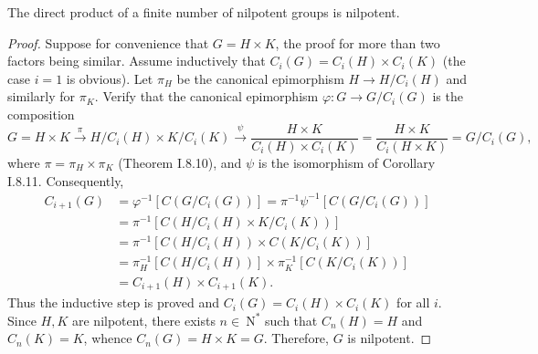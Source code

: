 \begin{theorem}
    The direct product of a finite number of nilpotent groups is nilpotent.
    \begin{proof}
        Suppose for convenience that $G=H \times K$, the proof for more than two factors being similar. Assume inductively that $C_i(G)=C_i(H) \times C_i(K)$ (the case $i=1$ is obvious). Let $\pi_H$ be the canonical epimorphism $H \rightarrow H / C_i(H)$ and similarly for $\pi_K$. Verify that the canonical epimorphism $\varphi: G \rightarrow G / C_i(G)$ is the composition
        \begin{equation*}
            G=H \times K \xrightarrow{\pi} H / C_i(H) \times K / C_i(K) \xrightarrow{\psi} \frac{H \times K}{C_i(H) \times C_i(K)}=\frac{H \times K}{C_i(H \times K)}=G / C_i(G),
        \end{equation*}
        where $\pi=\pi_H \times \pi_K$ (Theorem I.8.10), and $\psi$ is the isomorphism of Corollary I.8.11. Consequently,
        \begin{equation*}
            \begin{aligned}
                C_{i+1}(G) & =\varphi^{-1}\left[C\left(G / C_i(G)\right)\right]=\pi^{-1} \psi^{-1}\left[C\left(G / C_i(G)\right)\right] \\
                           & =\pi^{-1}\left[C\left(H / C_i(H) \times K / C_i(K)\right)\right]                                           \\
                           & =\pi^{-1}\left[C\left(H / C_i(H)\right) \times C\left(K / C_i(K)\right)\right]                             \\
                           & =\pi_H^{-1}\left[C\left(H / C_i(H)\right)\right] \times \pi_K^{-1}\left[C\left(K / C_i(K)\right)\right]    \\
                           & =C_{i+1}(H) \times C_{i+1}(K) .
            \end{aligned}
        \end{equation*}
        Thus the inductive step is proved and $C_i(G)=C_i(H) \times C_i(K)$ for all $i$. Since $H, K$ are nilpotent, there exists $n \in \mathrm{~N}^*$ such that $C_n(H)=H$ and $C_n(K)=K$, whence $C_n(G)=H \times K=G$. Therefore, $G$ is nilpotent.
    \end{proof}
\end{theorem}

